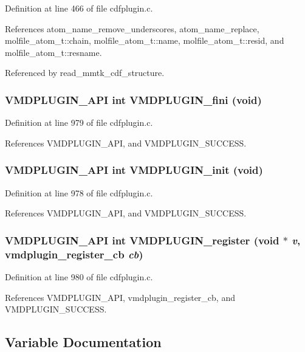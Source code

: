 Definition at line 466 of file cdfplugin.c.

References atom\_\-name\_\-remove\_\-underscores, atom\_\-name\_\-replace, molfile\_\-atom\_\-t::chain, molfile\_\-atom\_\-t::name, molfile\_\-atom\_\-t::resid, and molfile\_\-atom\_\-t::resname.

Referenced by read\_\-mmtk\_\-cdf\_\-structure.
\subsubsection{\setlength{\rightskip}{0pt plus 5cm}VMDPLUGIN\_\-API int VMDPLUGIN\_\-fini (void)}\label{cdfplugin_8c_a18}




Definition at line 979 of file cdfplugin.c.

References VMDPLUGIN\_\-API, and VMDPLUGIN\_\-SUCCESS.
\subsubsection{\setlength{\rightskip}{0pt plus 5cm}VMDPLUGIN\_\-API int VMDPLUGIN\_\-init (void)}\label{cdfplugin_8c_a17}




Definition at line 978 of file cdfplugin.c.

References VMDPLUGIN\_\-API, and VMDPLUGIN\_\-SUCCESS.
\subsubsection{\setlength{\rightskip}{0pt plus 5cm}VMDPLUGIN\_\-API int VMDPLUGIN\_\-register (void $\ast$ {\em v}, {\bf vmdplugin\_\-register\_\-cb} {\em cb})}\label{cdfplugin_8c_a19}




Definition at line 980 of file cdfplugin.c.

References VMDPLUGIN\_\-API, vmdplugin\_\-register\_\-cb, and VMDPLUGIN\_\-SUCCESS.

\subsection{Variable Documentation}
